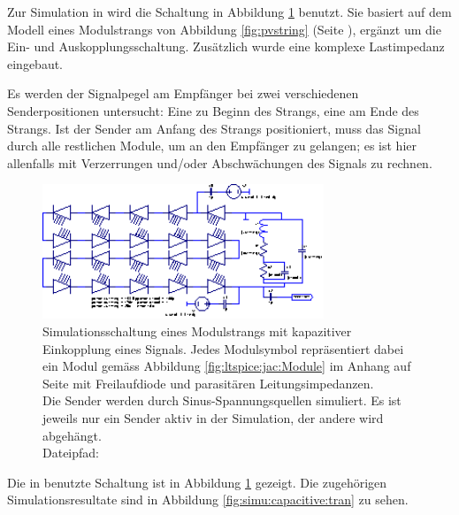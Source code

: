 Zur   Simulation   in     wird   die   Schaltung  in   Abbildung
\ref{fig:ltspice:capacitive:string} benutzt. Sie basiert  auf dem Modell eines
Modulstrangs von Abbildung  \ref{fig:pvstring} (Seite \pageref{fig:pvstring}),
erg\"anzt  um  die  Ein-  und  Auskopplungsschaltung. Zus\"atzlich  wurde  eine
komplexe Lastimpedanz eingebaut.

Es werden der Signalpegel am Empf\"anger bei zwei verschiedenen Senderpositionen
untersucht: Eine zu Beginn des Strangs, eine am Ende des Strangs. Ist der Sender
am Anfang des Strangs positioniert, muss das Signal durch alle restlichen Module,
um an den Empf\"anger zu gelangen; es ist hier allenfalls mit Verzerrungen und/oder
Abschw\"achungen des Signals zu rechnen.


\begin{figure}[h!tb]
    \centering
    \includegraphics[width=0.75\textwidth]{images/ltspice/jac/capacitive.eps}
    \caption[-Schaltung kapazitive Einkopplung, Modulstrang]{%
        Simulationsschaltung  eines Modulstrangs  mit kapazitiver  Einkopplung
        eines  Signals. Jedes   Modulsymbol  repr\"asentiert dabei  ein  Modul
        gem\"ass  Abbildung \ref{fig:ltspice:jac:Module}  im Anhang  auf Seite
        \pageref{fig:ltspice:jac:Module}  mit Freilaufdiode  und parasit\"aren
        Leitungsimpedanzen.\protect\\
        Die  Sender  werden  durch  Sinus-Spannungsquellen  simuliert. Es  ist
        jeweils  nur ein  Sender  aktiv  in der  Simulation,  der andere  wird
        abgeh\"angt.\protect\\
        Dateipfad: %
    }
    \label{fig:ltspice:capacitive:string}
\end{figure}

Die    in        benutzte    Schaltung    ist    in    Abbildung
\ref{fig:ltspice:capacitive:string}      gezeigt.       Die      zugeh\"origen
Simulationsresultate   sind    in   Abbildung   \ref{fig:simu:capacitive:tran}
zu sehen.%

